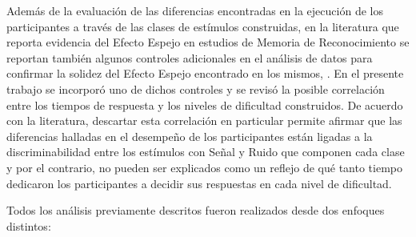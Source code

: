 \begin{enumerate}
Además de la evaluación de las diferencias encontradas en la ejecución de los participantes a través de las clases de estímulos construidas, en la literatura que reporta evidencia del Efecto Espejo en estudios de Memoria de Reconocimiento se reportan también algunos controles adicionales en el análisis de datos para confirmar la solidez del Efecto Espejo encontrado en los mismos, \parencite{Glanzer1990}. En el presente trabajo se incorporó uno de dichos controles y se revisó la posible correlación entre los tiempos de respuesta y los niveles de dificultad construidos. De acuerdo con la literatura, descartar esta correlación en particular permite afirmar que las diferencias halladas en el desempeño de los participantes están ligadas a la discriminabilidad entre los estímulos con Señal y Ruido que componen cada clase y por el contrario, no pueden ser explicados como un reflejo de qué tanto tiempo dedicaron los participantes a decidir sus respuestas en cada nivel de dificultad.\\
\end{enumerate}

Todos los análisis previamente descritos fueron realizados desde dos enfoques distintos:\\

